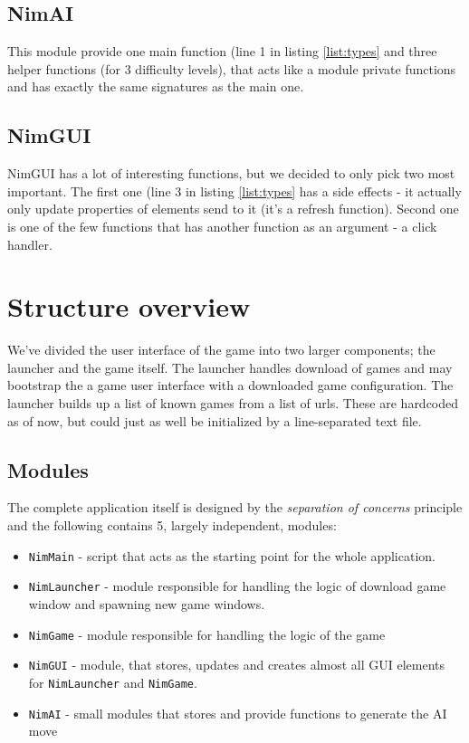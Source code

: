\documentclass[10pt]{scrartcl}
\begin{document}
\subsection{NimAI}
This module provide one main function (line 1 in listing \ref{list:types} and three helper functions (for 3 difficulty levels), that acts like a module private functions and has exactly the same signatures as the main one. 
\subsection{NimGUI}
NimGUI has a lot of interesting functions, but we decided to only pick two most important. The first one (line 3 in listing \ref{list:types} has a side effects - it actually only update properties of elements send to it (it's a refresh function). Second one is one of the few functions that has another function as an argument - a click handler.


\section{Structure overview}
We've divided the user interface of the game into two larger components; the launcher and the game itself. The launcher handles download of games and may bootstrap the a game user interface with a downloaded game configuration. The launcher builds up a list of known games from a list of urls. These are hardcoded as of now, but could just as well be initialized by a line-separated text file.
\subsection{Modules}
The complete application itself is designed by the \emph{separation of concerns} principle and the following contains 5, largely independent, modules:
\begin{itemize}
  \item \texttt{NimMain} - script that acts as the starting point for the whole application.
  \item \texttt{NimLauncher} - module responsible for handling the logic of download game window and spawning new game windows.
  \item \texttt{NimGame} - module responsible for handling the logic of the game
  \item \texttt{NimGUI} - module, that stores, updates and creates almost all GUI elements for \texttt{NimLauncher} and \texttt{NimGame}.
  \item \texttt{NimAI} - small modules that stores and provide functions to generate the AI move
\end{itemize}
\end{document}
